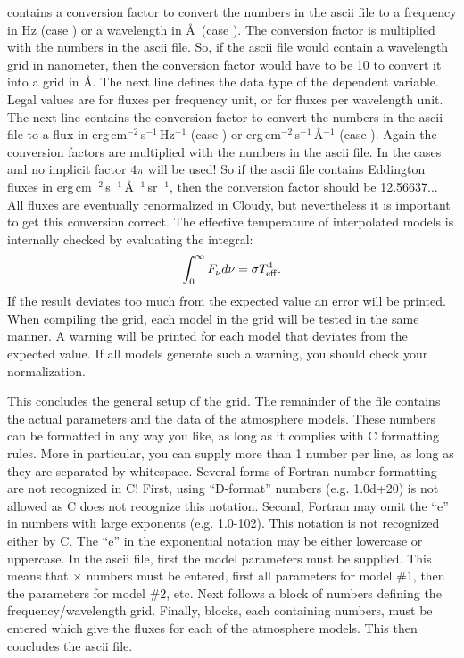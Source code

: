 contains a conversion factor to convert the numbers in the ascii file to a
frequency in Hz (case ) or a wavelength in \AA\ (case
). The conversion factor is multiplied with the numbers in
the ascii file. So, if the ascii file would contain a wavelength grid in
nanometer, then the conversion factor would have to be 10 to convert it into a
grid in \AA. The next line defines the data type of the dependent variable.
Legal values are  for fluxes per frequency unit, or
 for fluxes per wavelength unit. The next
line contains the conversion factor to convert the numbers in the ascii file
to a flux in erg\,cm$^{-2}$\,s$^{-1}$\,Hz$^{-1}$ (case ) or erg\,cm$^{-2}$\,s$^{-1}$\,\AA$^{-1}$ (case ). Again the conversion factors are multiplied with the numbers in
the ascii file. In the cases  and  no
implicit factor $4\pi$ will be used! So if the ascii file contains Eddington
fluxes  in erg\,cm$^{-2}$\,s$^{-1}$\,\AA$^{-1}$\,sr$^{-1}$,
then the conversion factor should be 12.56637$\ldots$ All fluxes are
eventually renormalized in Cloudy, but nevertheless it is important to get
this conversion correct. The effective temperature of interpolated models is
internally checked by evaluating the integral:
\[ \int_0^\infty F_\nu d \nu = \sigma T_{\rm eff}^4. \]
If the result deviates too much from the expected value an error will be
printed. When compiling the grid, each model in the grid will be tested in the
same manner. A warning will be printed for each model that deviates from the
expected value. If all models generate such a warning, you should check your
normalization.

This concludes the general setup of the grid. The remainder of the file
contains the actual parameters and the data of the atmosphere models. These
numbers can be formatted in any way you like, as long as it complies with C
formatting rules. More in particular, you can supply more than 1 number per
line, as long as they are separated by whitespace. Several forms of Fortran
number formatting are not recognized in C! First, using ``D-format'' numbers
(e.g. 1.0d+20) is not allowed as C does not recognize this notation. Second,
Fortran may omit the ``e'' in numbers with large exponents (e.g. 1.0-102).
This notation is not recognized either by C. The ``e'' in the exponential
notation may be either lowercase or uppercase. In the ascii file, first the
model parameters must be supplied. This means that  $\times$
 numbers must be entered, first all parameters for model \#1,
then the parameters for model \#2, etc. Next follows a block of
 numbers defining the frequency/wavelength grid. Finally,
 blocks, each containing  numbers, must be
entered which give the fluxes for each of the atmosphere models. This then
concludes the ascii file.

